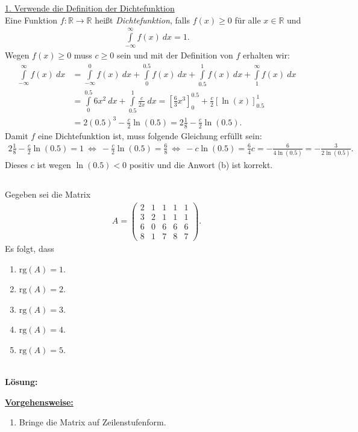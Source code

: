 \underline{1. Verwende die Definition der Dichtefunktion}\\
Eine Funktion $f : \mathbb{R} \to \mathbb{R}$ heißt \textit{Dichtefunktion}, falls $f(x) \geq 0$ für alle $x \in \mathbb{R}$ und
\begin{align*}
	\int \limits_{- \infty}^\infty f(x) \ dx = 1.
\end{align*}
Wegen $f(x) \geq 0 $ muss $c \geq 0 $ sein und mit der Definition von $f$ erhalten wir:
\begin{align*}
	\int \limits_{- \infty}^\infty f(x) \ dx
	&=
	\int \limits_{- \infty}^0 f(x) \ dx
	+
	\int \limits_{0}^{0.5} f(x) \ dx
	+
	\int \limits_{0.5}^{1} f(x) \ dx
	+
	\int \limits_{1}^{\infty} f(x) \ dx\\
	&=
	\int \limits_{0}^{0.5} 6x^2 \ dx
	+
	\int \limits_{0.5}^{1} \frac{c}{2x} \ dx
	=
	\left[\frac{6}{3} x^3 \right]_0^{0.5}
	+
	\frac{c}{2} \left[\ln(x)\right]_{0.5}^1\\
	&=
	2 (0.5)^3 - \frac{c}{2} \ln(0.5)	
	=
	2 \frac{1}{8} - \frac{c}{2} \ln(0.5).
\end{align*}
Damit $f$ eine Dichtefunktion ist, muss folgende Gleichung erfüllt sein:
\begin{align*}
	2 \frac{1}{8} - \frac{c}{2} \ln(0.5) = 1
	\ \Leftrightarrow \
	- \frac{c}{2} \ln(0.5) = \frac{6}{8}
	\ \Leftrightarrow \
	- c \ln(0.5) = \frac{6}{4}
	c = - \frac{6}{4 \ln(0.5)} = -\frac{3}{2 \ln(0.5)}.
\end{align*}
Dieses $c$ ist wegen $\ln(0.5 ) < 0 $ positiv und die Anwort (b) ist korrekt.

\newpage

\subsection*{}
Gegeben sei die Matrix
\begin{align*}
	A =
	\begin{pmatrix}
		2 & 1 & 1 & 1 & 1 \\
		3 & 2 & 1 & 1 & 1 \\
		6 & 0 & 6 & 6 & 6 \\ 
		8 & 1 & 7 & 8 & 7
	\end{pmatrix}.
\end{align*}
Es folgt, dass
\renewcommand{\labelenumi}{(\alph{enumi})}
\begin{enumerate}
	\item 
	$ \mathrm{rg}(A) = 1 $.
	\item 
	$ \mathrm{rg}(A) = 2 $.
	\item
	$ \mathrm{rg}(A) = 3 $.
	\item
	$ \mathrm{rg}(A) = 4 $.
	\item
	$ \mathrm{rg}(A) = 5 $.
\end{enumerate}
\ \\
\textbf{Lösung:}
\begin{mdframed}
\underline{\textbf{Vorgehensweise:}}
\renewcommand{\labelenumi}{\theenumi.}
\begin{enumerate}
\item Bringe die Matrix auf Zeilenstufenform.
\end{enumerate}
\end{mdframed}

